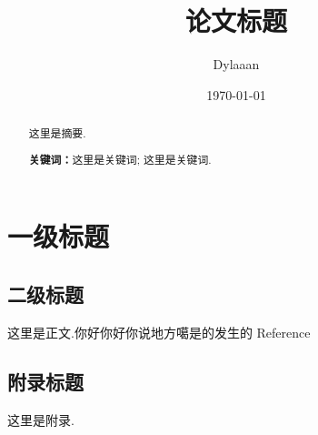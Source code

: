 \documentclass[12pt, a4paper, oneside]{ctexart}
\title{\textbf{论文标题}}
\author{Dylaaan}
\date{\today}
\newcommand{\upcite}[1]{\textsuperscript{\textsuperscript{\cite{#1}}}}
\begin{document}
\maketitle

\setcounter{page}{0}
\maketitle
\thispagestyle{empty}

\begin{abstract}
    这里是摘要.
    \par\textbf{关键词：}这里是关键词; 这里是关键词.
\end{abstract}

\newpage
{}
\setcounter{page}{1}
\tableofcontents
\newpage
\setcounter{page}{1}

\section{一级标题}

\subsection{二级标题}

这里是正文\upcite{wk}.你好你好你说地方噶是的发生的\upcite{Mishra2023}
\newpage
Reference


\begin{appendices}
    \renewcommand{\thesection}{\Alph{section}}
    \section{附录标题}
    这里是附录.
\end{appendices}
\end{document}
